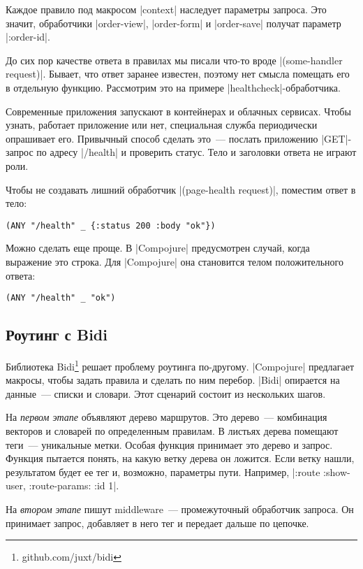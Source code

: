 Каждое правило под макросом \spverb|context| наследует параметры запроса. Это значит,
обработчики \spverb|order-view|, \spverb|order-form| и \spverb|order-save| получат
параметр \spverb|:order-id|.

До сих пор качестве ответа в правилах мы писали что-то вроде
\spverb|(some-handler request)|. Бывает, что ответ заранее известен,
поэтому нет смысла помещать его в отдельную функцию. Рассмотрим это на примере
\spverb|healthcheck|-обработчика.

Современные приложения запускают в контейнерах и облачных сервисах.  Чтобы
узнать, работает приложение или нет, специальная служба периодически опрашивает
его. Привычный способ сделать это~--- послать приложению \spverb|GET|-запрос по адресу
\spverb|/health| и проверить статус. Тело и заголовки ответа не играют роли.

Чтобы не создавать лишний обработчик \spverb|(page-health request)|, поместим ответ в
тело:

\begin{verbatim}
(ANY "/health" _ {:status 200 :body "ok"})
\end{verbatim}

Можно сделать еще проще. В \spverb|Compojure| предусмотрен случай, когда
выражение это строка. Для \spverb|Compojure| она становится телом положительного
ответа:

\begin{verbatim}
(ANY "/health" _ "ok")
\end{verbatim}

\subsection{Роутинг с Bidi}

Библиотека Bidi\footnote{github.com/juxt/bidi} решает проблему роутинга по-другому.
\spverb|Compojure| предлагает макросы, чтобы задать правила и сделать по ним перебор. \spverb|Bidi|
опирается на данные~--- списки и словари. Этот сценарий состоит из нескольких шагов.

На \emph{первом этапе} объявляют дерево маршрутов. Это дерево~--- комбинация
векторов и словарей по определенным правилам. В листьях дерева помещают теги~---
уникальные метки. Особая функция принимает это дерево и запрос. Функция пытается понять,
на какую ветку дерева он ложится. Если ветку нашли, результатом будет ее тег и, возможно,
параметры пути. Например, \spverb|{:route :show-user, :route-params: {:id 1}}|.

На \emph{втором этапе} пишут middleware~--- промежуточный обработчик запроса.
Он принимает запрос, добавляет в него тег и передает дальше по цепочке.

